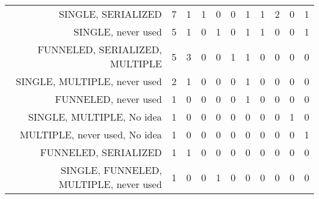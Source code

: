 {\begin{landscape}
\begin{longtable}[htb]{r|c|c|c|c|c|c|c|c|c|c}
{SINGLE, SERIALIZED} & 7 & 1 & 1 & 0 & 0 & 1 & 1 & 2 & 0 & 1 \\%
{SINGLE, never used} & 5 & 1 & 0 & 1 & 0 & 1 & 1 & 0 & 0 & 1 \\%
{FUNNELED, SERIALIZED, MULTIPLE} & 5 & 3 & 0 & 0 & 1 & 1 & 0 & 0 & 0 & 0 \\%
{SINGLE, MULTIPLE, never used} & 2 & 1 & 0 & 0 & 0 & 1 & 0 & 0 & 0 & 0 \\%
{FUNNELED, never used} & 1 & 0 & 0 & 0 & 0 & 1 & 0 & 0 & 0 & 0 \\%
{SINGLE, MULTIPLE, No idea} & 1 & 0 & 0 & 0 & 0 & 0 & 0 & 0 & 1 & 0 \\%
{MULTIPLE, never used, No idea} & 1 & 0 & 0 & 0 & 0 & 0 & 0 & 0 & 0 & 1 \\%
{FUNNELED, SERIALIZED} & 1 & 1 & 0 & 0 & 0 & 0 & 0 & 0 & 0 & 0 \\%
{SINGLE, FUNNELED, MULTIPLE, never used} & 1 & 0 & 0 & 1 & 0 & 0 & 0 & 0 & 0 & 0 \\%
\hline%
\end{longtable}%
\end{landscape}}%
\clearpage%
